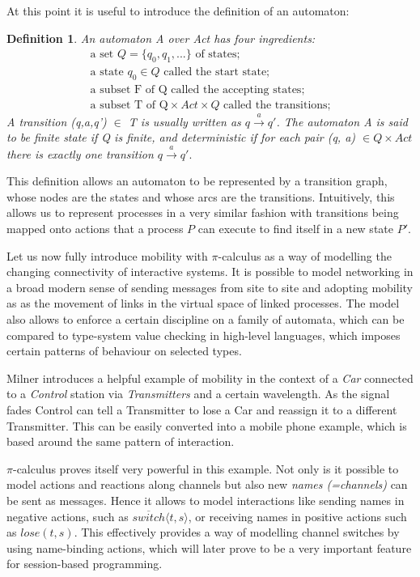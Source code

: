 At this point it is useful to introduce the definition of an automaton:

\newtheorem{automaton}{Definition}
\begin{automaton}
An automaton A over Act has four ingredients:
\begin{align}
\mbox{a set }Q = \{q_0,q_1,...\}\mbox{ of states;}\nonumber\\
\mbox{a state } q_0 \in Q  \mbox{ called the start state;}\nonumber\\
\mbox{a subset F of Q called the accepting states;}\nonumber\\
\mbox{a subset T of Q} \times Act \times Q\mbox{ called the transitions;}\nonumber
\end{align}
A transition (q,a,q')  $\in$ T is usually written as $q \xrightarrow{a} q'$. The automaton A is said to be finite state if Q is finite, and deterministic if for each pair (q, a) $\in Q \times Act$ there is exactly one transition $q \xrightarrow{a} q'.$\cite{pi-calculus}
\end{automaton}

This definition allows an automaton to be represented by a transition graph, whose nodes are the states and whose arcs are the transitions. Intuitively, this allows us to represent processes in a very similar fashion with transitions being mapped onto actions that a process $P$ can execute to find itself in a new state $P'$.

Let us now fully introduce mobility with $\pi$-calculus as a way of modelling the changing connectivity of interactive systems. It is possible to model networking in a broad modern sense of sending messages from site to site and adopting mobility as as the movement of links in the virtual space of linked processes. The model also allows to enforce a certain discipline on a family of automata, which can be compared to type-system value checking in high-level languages, which imposes certain patterns of behaviour on selected types.

Milner\cite{pi-calculus} introduces a helpful example of mobility in the context of a \textit{Car} connected to a \textit{Control} station via \textit{Transmitters} and a certain wavelength. As the signal fades Control can tell a Transmitter to lose a Car and reassign it to a different Transmitter. This can be easily converted into a mobile phone example, which is based around the same pattern of interaction.

$\pi$-calculus proves itself very powerful in this example. Not only is it possible to model actions and reactions along channels but also new \textit{names (=channels)} can be sent as messages. Hence it allows to model interactions like sending names in negative actions, such as $\overline{switch}\langle t,s \rangle$, or receiving names in positive actions such as $lose(t,s)$. This effectively provides a way of modelling channel switches by using name-binding actions, which will later prove to be a very important feature for session-based programming.

